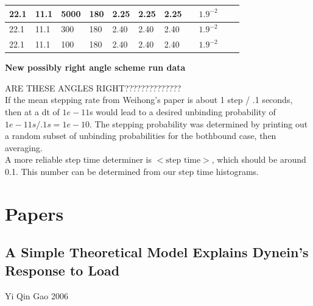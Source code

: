 \documentclass[10pt]{article} %
\begin{document}
\begin{center}
\begin{tabular}{| l | l | l | l | l | l | l | p{3cm} | p{2cm} | l | p{5cm} |}
    22.1 & 11.1 & 5000 &  180 & 2.25 & 2.25 & 2.25 & & $1.9^{-2}$ & & \\\hline
    22.1 & 11.1 & 300 &  180 & 2.40 & 2.40 & 2.40 & & $1.9^{-2}$ & & \\\hline
    22.1 & 11.1 & 100 &  180 & 2.40 & 2.40 & 2.40 & & $1.9^{-2}$ & & \\\hline
  \end{tabular}
  \textbf{New possibly right angle scheme run data}
\end{center}

ARE THESE ANGLES RIGHT??????????????\\

If the mean stepping rate from Weihong's paper is about 1 step / .1 seconds, then at a dt of $1e-11$s would lead to a desired unbinding
probability of $1e-11s/.1s = 1e-10$. The stepping probability was determined by printing out a random subset of unbinding probabilities
for the bothbound case, then averaging.\\

A more reliable step time determiner is $\Big<\mbox{step time}\Big>$, which should be around 0.1. This number can be determined from our step time histograms.\\

\section{Papers}
\subsection{A Simple Theoretical Model Explains Dynein’s Response to Load}
Yi Qin Gao 2006
\end{document}
